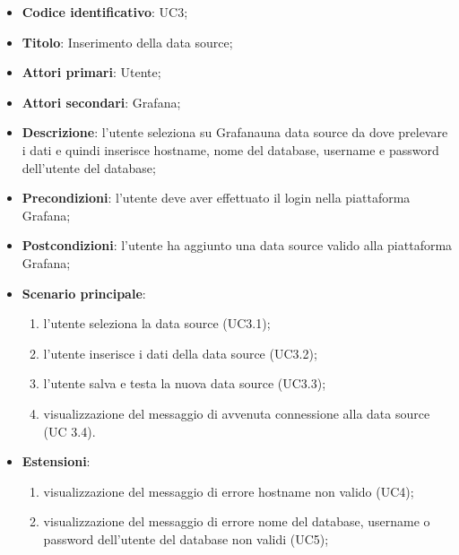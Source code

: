 \begin{itemize}
    \item \textbf{Codice identificativo}: UC3;
    \item \textbf{Titolo}: Inserimento della data source;
    \item \textbf{Attori primari}: Utente;
    \item \textbf{Attori secondari}: Grafana\glo;
    \item \textbf{Descrizione}: l'utente seleziona su Grafana\glosp una data source da dove prelevare i dati e quindi inserisce hostname, nome del database, username e                                password dell'utente del database;
    \item \textbf{Precondizioni}: l'utente deve aver effettuato il login nella piattaforma Grafana\glo;
    \item \textbf{Postcondizioni}: l'utente ha aggiunto una data source valido alla piattaforma Grafana\glo;
    \item \textbf{Scenario principale}:
    \begin{enumerate}
        \item l'utente seleziona la data source (UC3.1);
        \item l'utente inserisce i dati della data source (UC3.2);
        \item l'utente salva e testa la nuova data source (UC3.3);
        \item visualizzazione del messaggio di avvenuta connessione alla data source (UC 3.4).
    \end{enumerate}
    \item \textbf{Estensioni}:
    \begin{enumerate}
        \item visualizzazione del messaggio di errore hostname non valido (UC4);
        \item visualizzazione del messaggio di errore nome del database, username o password dell'utente del database non validi (UC5);
    \end{enumerate}
\end{itemize}
